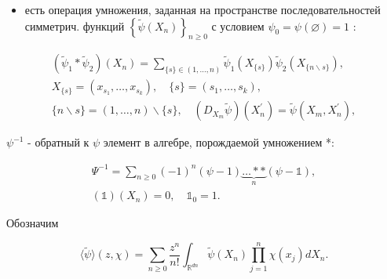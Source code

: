 \documentclass[10pt]{article}
\begin{document}
\begin{itemize}

  \item есть операция умножения, заданная на пространстве последовательностей симметрич. функций $\left\{\tilde{\psi}\left(X_{n}\right)\right\}_{n \geqslant 0}$ с условием $\psi_{0}=\psi(\varnothing)=1$ :

\end{itemize}



\[

\begin{gathered}

\left(\tilde{\psi}_{1} * \tilde{\psi}_{2}\right)\left(X_{n}\right)=\sum_{\{s\} \in(1, \ldots, n)} \tilde{\psi}_{1}\left(X_{\{s\}}\right) \tilde{\psi}_{2}\left(X_{\{n \backslash s\}}\right), \\

X_{\{s\}}=\left(x_{s_{1}}, \ldots, x_{s_{k}}\right), \quad\{s\}=\left(s_{1}, \ldots, s_{k}\right), \\

\{n \backslash s\}=(1, \ldots, n) \backslash\{s\}, \quad\left(D_{X_{m}} \tilde{\psi}\right)\left(X_{n}^{\prime}\right)=\tilde{\psi}\left(X_{m}, X_{n}^{\prime}\right),

\end{gathered}

\]



$\psi^{-1}$ - обратный к $\psi$ элемент в алгебре, порождаемой умножением *:



\[

\begin{gathered}

\Psi^{-1}=\sum_{n \geqslant 0}(-1)^{n}(\psi-1) \underbrace{\ldots * *}_{n}(\psi-\mathbb{1}), \\

(\mathbb{1})\left(X_{n}\right)=0, \quad \mathbb{1}_{0}=1 .

\end{gathered}

\]



Обозначим



\[

\langle\tilde{\psi}\rangle(z, \chi)=\sum_{n \geqslant 0} \frac{z^{n}}{n !} \int_{\mathbb{R}^{d n}} \tilde{\psi}\left(X_{n}\right) \prod_{j=1}^{n} \chi\left(x_{j}\right) d X_{n} .

\]
\end{document}
